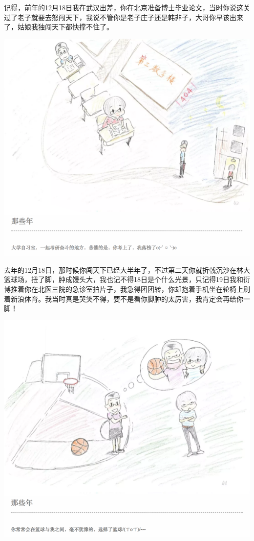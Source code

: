 \documentclass[]{book}
\begin{document}
记得，前年的12月18日我在武汉出差，你在北京准备博士毕业论文，当时你说这关过了老子就要去怒闯天下，我说不管你是老子庄子还是韩非子，大哥你早该出来了，姑娘我独闯天下都快撑不住了。

\includegraphics[width=8.33in]{images/wife2}

去年的12月18日，那时候你闯天下已经大半年了，不过第二天你就折戟沉沙在林大篮球场，扭了脚，肿成馒头大，我也记不得18日是个什么光景，只记得19日我和衍博推着你在北医三院的急诊室拍片子，我急得团团转，你却抱着手机坐在轮椅上刷着新浪体育。我当时真是哭笑不得，要不是看你脚肿的太厉害，我肯定会再给你一脚！

\includegraphics[width=8.33in]{images/wife3}
\end{document}
